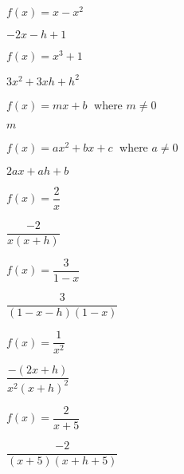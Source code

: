 \documentclass{ximera}
\begin{document}
\begin{question}
\begin{problem}
$f(x) = x-x^2$

\begin{solution}
$-2x-h+1$
\end{solution}
\end{problem} 

\begin{problem}
$f(x) = x^{3} + 1$

\begin{solution}
    $3x^{2} + 3xh + h^{2}$
\end{solution}
\end{problem}  

\begin{problem}
$f(x) = mx + b\;$ where $m \neq 0$

\begin{solution}
    $m$
\end{solution}
\end{problem} 

\begin{problem}
$f(x) = ax^{2} + bx + c\;$ where $a \neq 0$

\begin{solution}
    $2ax + ah + b$
\end{solution}
\end{problem}  

\begin{problem}
$f(x) = \dfrac{2}{x}$

\begin{solution}
    $\dfrac{-2}{x(x+h)}$
\end{solution}
\end{problem} 

\begin{problem}
$f(x) = \dfrac{3}{1-x}$

\begin{solution}
    $\dfrac{3}{(1-x-h)(1-x)}$
\end{solution}
\end{problem}

\begin{problem}
$f(x) = \dfrac{1}{x^2}$

\begin{solution}
$\dfrac{-(2x+h)}{x^2(x+h)^2}$
\end{solution}
\end{problem}  

\begin{problem}
 $f(x) = \dfrac{2}{x+5}$

 \begin{solution}
     $\dfrac{-2}{(x+5)(x+h+5)}$
 \end{solution}
\end{problem}


\end{question}
\end{document}
